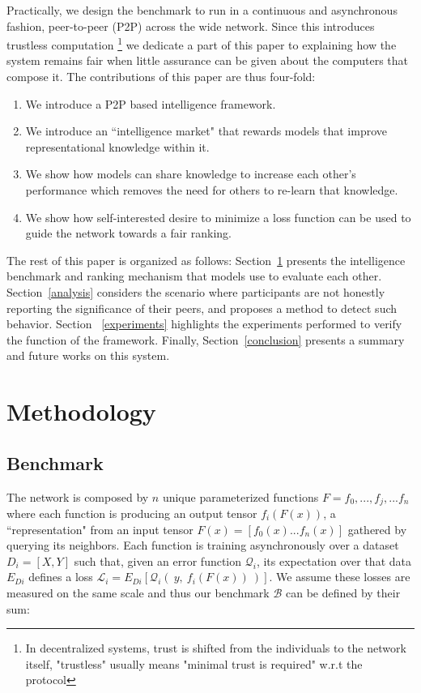 \documentclass{article}
\begin{document}
Practically, we design the benchmark to run in a continuous and asynchronous fashion, peer-to-peer (P2P) across the wide network. Since this introduces trustless computation \footnote{ In decentralized systems, trust is shifted from the individuals to the network itself, "trustless" usually means "minimal trust is required" w.r.t the protocol} we dedicate a part of this paper to explaining how the system remains fair when little assurance can be given about the computers that compose it. The contributions of this paper are thus four-fold:
\begin{enumerate}
	\item We introduce a P2P based intelligence framework.
	\item We introduce an ``intelligence market" that rewards models that improve representational knowledge within it.
	\item We show how models can share knowledge to increase each other's performance which removes the need for others to re-learn that knowledge. 
	\item We show how self-interested desire to minimize a loss function can be used to guide the network towards a fair ranking.
\end{enumerate}

The rest of this paper is organized as follows: Section~\ref{methodology} presents the intelligence benchmark and ranking mechanism that models use to evaluate each other. Section~\ref{analysis} considers the scenario where participants are not honestly reporting the significance of their peers, and proposes a method to detect such behavior. Section ~\ref{experiments} highlights the experiments performed to verify the function of the framework. Finally, Section~\ref{conclusion} presents a summary and future works on this system.

\section{Methodology}
\label{methodology}

\subsection{Benchmark}

The network is composed by $n$ unique parameterized functions $F = {f_0, ...,  f_j, ...f_n}$ where each function is producing an output tensor $f_i(F(x))$, a ``representation" from an input tensor $F(x) = [f_0{(x)} ... f_n{(x)}]$ gathered by querying its neighbors. Each function is training asynchronously over a dataset $D_i=[X,Y]$ such that, given an error function $\mathcal{Q}_i$, its expectation over that data $E_{Di}$ defines a loss $\mathcal{L}_i = E_{Di}[\mathcal{Q}_i( \ y, \ f_i(F(x)) \ )]$. We assume these losses are measured on the same scale and thus our benchmark $\mathcal{B}$ can be defined by their sum:
\bigskip
\end{document}
